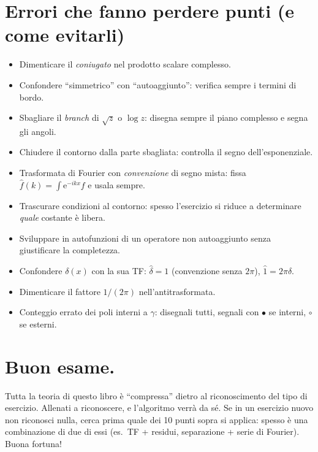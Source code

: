 \documentclass[11pt,a4paper,openany]{book}
\theoremstyle{definition}
\newcommand{\eu}{\mathrm{e}}
\begin{document}
\section{Errori che fanno perdere punti (e come evitarli)}
\begin{itemize}
\item Dimenticare il \emph{coniugato} nel prodotto scalare complesso.
\item Confondere ``simmetrico'' con ``autoaggiunto'': verifica sempre i termini di bordo.
\item Sbagliare il \emph{branch} di $\sqrt z$ o $\log z$: disegna sempre il piano complesso e segna gli angoli.
\item Chiudere il contorno dalla parte sbagliata: controlla il segno dell'esponenziale.
\item Trasformata di Fourier con \emph{convenzione} di segno mista: fissa $\hat f(k)=\int\eu^{-ikx}f$ e usala sempre.
\item Trascurare condizioni al contorno: spesso l'esercizio si riduce a determinare \emph{quale} costante \`e libera.
\item Sviluppare in autofunzioni di un operatore non autoaggiunto senza giustificare la completezza.
\item Confondere $\delta(x)$ con la sua TF: $\hat\delta=1$ (convenzione senza $2\pi$), $\hat 1=2\pi\delta$.
\item Dimenticare il fattore $1/(2\pi)$ nell'antitrasformata.
\item Conteggio errato dei poli interni a $\gamma$: disegnali tutti, segnali con $\bullet$ se interni, $\circ$ se esterni.
\end{itemize}

\section{Buon esame.}
Tutta la teoria di questo libro \`e ``compressa'' dietro al riconoscimento del tipo di esercizio. Allenati a riconoscere, e l'algoritmo verr\`a da s\'e. Se in un esercizio nuovo non riconosci nulla, cerca prima quale dei 10 punti sopra si applica: spesso \`e una combinazione di due di essi (es.\ TF + residui, separazione + serie di Fourier). Buona fortuna!
\end{document}
